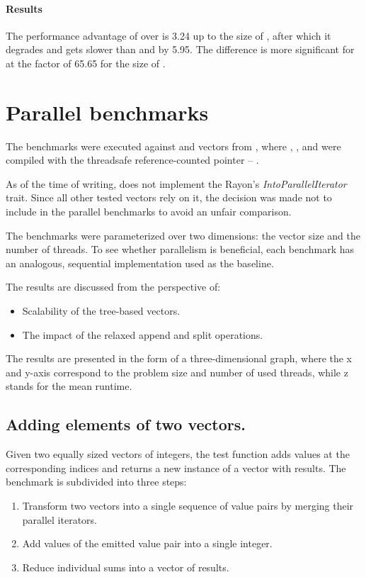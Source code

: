 \paragraph{Results}
The performance advantage of \stdvec{} over \rrbvec{} is 3.24 up to the size of , after which it degrades and gets slower than \imrsvec{} and \rrbvec{} by 5.95. The difference is more significant for \rbvec{} at the factor of 65.65 for the size of .

\section{Parallel benchmarks}
\label{sec:par-benchmarks}
The benchmarks were executed against \stdvec{} and vectors from \pvecrs{}, where \rbvec{}, \rrbvec{}, and \pvec{} were compiled with the threadsafe reference-counted pointer -- \arc{}.

As of the time of writing, \imrsvec{} does not implement the Rayon's \emph{IntoParallelIterator} trait. Since all other tested vectors rely on it, the decision was made not to include \imrsvec{} in the parallel benchmarks to avoid an unfair comparison.

The benchmarks were parameterized over two dimensions: the vector size and the number of threads. To see whether parallelism is beneficial, each benchmark has an analogous, sequential implementation used as the baseline.

The results are discussed from the perspective of:
\begin{itemize}
    \item Scalability of the tree-based vectors.
    \item The impact of the relaxed append and split operations.
\end{itemize}

The results are presented in the form of a three-dimensional graph, where the x and y-axis correspond to the problem size and number of used threads, while z stands for the mean runtime.

\subsection{Adding elements of two vectors.}
Given two equally sized vectors of integers, the test function adds values at the corresponding indices and returns a new instance of a vector with results. The benchmark is subdivided into three steps:

\begin{enumerate}
    \item Transform two vectors into a single sequence of value pairs by merging their parallel iterators.
    \item Add values of the emitted value pair into a single integer.
    \item Reduce individual sums into a vector of results.
\end{enumerate}

